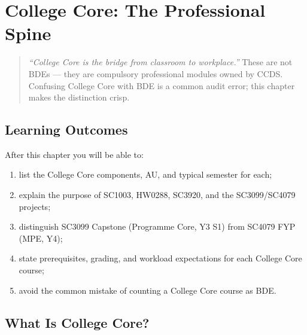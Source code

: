 \chapter{College Core: The Professional Spine}
\label{ch:college-core}

\begin{quote}
\emph{``College Core is the bridge from classroom to workplace.''} These are not BDEs --- they are compulsory professional modules owned by CCDS. Confusing College Core with BDE is a common audit error; this chapter makes the distinction crisp.
\end{quote}

\noindent{}
\vspace{0.4em}

\section*{Learning Outcomes}
After this chapter you will be able to:
\begin{enumerate}[label=(L\arabic*)]
    \item list the College Core components, AU, and typical semester for each;
    \item explain the purpose of SC1003, HW0288, SC3920, and the SC3099/SC4079 projects;
    \item distinguish SC3099 Capstone (Programme Core, Y3 S1) from SC4079 FYP (MPE, Y4);
    \item state prerequisites, grading, and workload expectations for each College Core course;
    \item avoid the common mistake of counting a College Core course as BDE.
\end{enumerate}

\section{What Is College Core?}
\label{sec:what-college-core}

